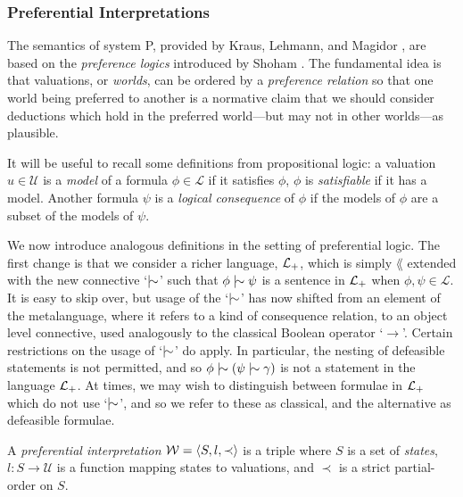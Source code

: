\subsubsection{Preferential Interpretations}
\label{subsubsection:preferential-interpretations}

The semantics of system P, provided by Kraus, Lehmann, and Magidor \cite{kraus1990nonmonotonic}, are based on the \textit{preference
	logics} introduced by Shoham \cite{shohamSemanticApproach}. The fundamental idea is that valuations, or \textit{worlds},
can be ordered by a \textit{preference relation} so that one world being preferred to another is a normative claim that we
should consider deductions which hold in the preferred world---but may not in other worlds---as plausible.

It will be useful to recall some definitions from propositional logic: a valuation $u \in \mathcal{U}$ is a \textit{model}
of a formula $\phi \in \mathcal{L}$ if it satisfies $\phi$, $\phi$ is \textit{satisfiable} if it has a model. Another
formula $\psi$ is a \textit{logical consequence} of $\phi$ if the models of $\phi$ are a subset of the models of $\psi$.

We now introduce analogous definitions in the setting of preferential logic. The first change is that we consider a
richer language, $\mathcal{L}_+$, which is simply $\lang$ extended with the new connective `$\twiddle$' such that
$\phi \twiddle \psi$ is a sentence in $\mathcal{L}_+$ when $\phi, \psi \in \mathcal{L}$. It is easy to skip over, but usage of
the `$\twiddle$' has now shifted from an element of the metalanguage, where it refers to a kind of consequence relation,
to an object level connective, used analogously to the classical Boolean operator `$\rightarrow$'. Certain restrictions
on the usage of `$\twiddle$' do apply. In particular, the nesting of defeasible statements is not permitted, and so $\phi
	\twiddle (\psi \twiddle \gamma )$ is not a statement in the language $\mathcal{L}_+$. At times, we may wish to distinguish between
formulae in $\mathcal{L}_+$ which do not use `$\twiddle$', and so we refer to these as classical, and the alternative as defeasible
formulae.

\begin{definition}
	\label{definition:preferential-interpretation} 

	A \emph{preferential interpretation} $\mathcal{W} = \langle S,l,\prec \rangle$ is a triple where $S$ is a set of \emph{states}, $l: S \to \mathcal{U}$ is
	a function mapping states to valuations, and $\prec$ is a strict partial-order on $S$.
\end{definition}

